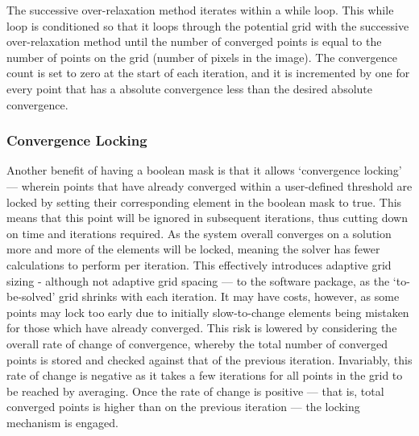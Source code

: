 The successive over-relaxation method iterates within a while loop. This while loop is conditioned so that it loops through the potential grid with the successive over-relaxation method until the number of converged points is equal to the number of points on the grid (number of pixels in the image). The convergence count is set to zero at the start of each iteration, and it is incremented by one for every point that has a absolute convergence less than the desired absolute convergence.

		\subsubsection{Convergence Locking}
		
			Another benefit of having a boolean mask is that it allows `convergence locking' --- wherein points that have already converged within a user-defined threshold are locked by setting their corresponding element in the boolean mask to true. This means that this point will be ignored in subsequent iterations, thus cutting down on time and iterations required. As the system overall converges on a solution more and more of the elements will be locked, meaning the solver has fewer calculations to perform per iteration. This effectively introduces adaptive grid sizing - although not adaptive grid spacing --- to the software package, as the `to-be-solved' grid shrinks with each iteration. It may have costs, however, as some points may lock too early due to initially slow-to-change elements being mistaken for those which have already converged. This risk is lowered by considering the overall rate of change of convergence, whereby the total number of converged points is stored and checked against that of the previous iteration. Invariably, this rate of change is negative as it takes a few iterations for all points in the grid to be reached by averaging. Once the rate of change is positive --- that is, total converged points is higher than on the previous iteration --- the locking mechanism is engaged.
